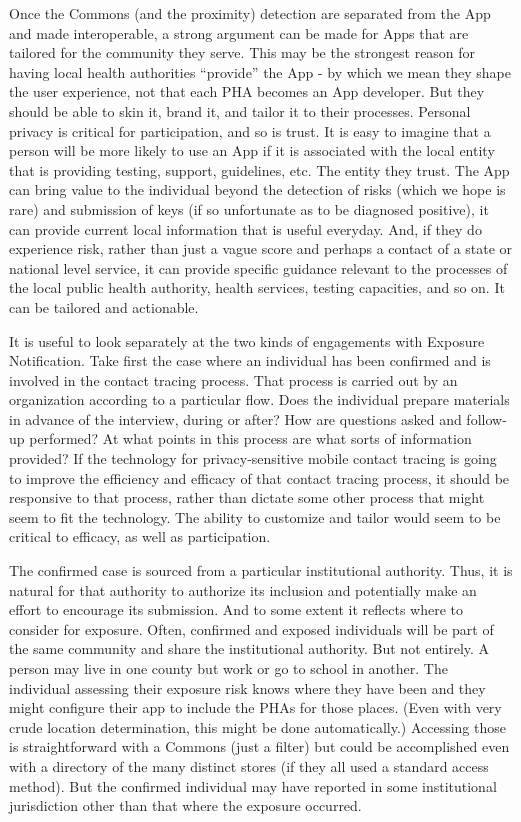 Once the Commons (and the proximity) detection are separated from the App and made interoperable, a strong argument can be made for Apps that are tailored for the community they serve.  This may be the strongest reason for having local health authorities “provide” the App - by which we mean they shape the user experience, not that each PHA becomes an App developer.  But they should be able to skin it, brand it, and tailor it to their processes. Personal privacy is critical for participation, and so is trust.  It is easy to imagine that a person will be more likely to use an App if it is associated with the local entity that is providing testing, support, guidelines, etc.  The entity they trust.  The App can bring value to the individual beyond the detection of risks (which we hope is rare) and submission of keys (if so unfortunate as to be diagnosed positive), it can provide current local information that is useful everyday.  And, if they do experience risk, rather than just a vague score and perhaps a contact of a state or national level service, it can provide specific guidance relevant to the processes of the local public health authority, health services, testing capacities, and so on.  It can be tailored and actionable.

It is useful to look separately at the two kinds of engagements with Exposure Notification.  Take first the case where an individual has been confirmed and is involved in the contact tracing process.  That process is carried out by an organization according to a particular flow.  Does the individual prepare materials in advance of the interview, during or after?  How are questions asked and follow-up performed?  At what points in this process are what sorts of information provided?  If the technology for privacy-sensitive mobile contact tracing is going to improve the efficiency and efficacy of that contact tracing process, it should be responsive to that process, rather than dictate some other process that might seem to fit the technology.  The ability to customize and tailor would seem to be critical to efficacy, as well as participation.

The confirmed case is sourced from a particular institutional authority.  Thus, it is natural for that authority to authorize its inclusion and potentially make an effort to encourage its submission.  And to some extent it reflects where to consider for exposure. Often, confirmed and exposed individuals will be part of the same community and share the institutional authority.  But not entirely.  A person may live in one county but work or go to school in another.  The individual assessing their exposure risk knows where they have been and they might configure their app to include the PHAs for those places.  (Even with very crude location determination, this might be done automatically.) Accessing those is straightforward with a Commons (just a filter) but could be accomplished even with a directory of the many distinct stores (if they all used a standard access method).  But the confirmed individual may have reported in some institutional jurisdiction other than that where the exposure occurred.

